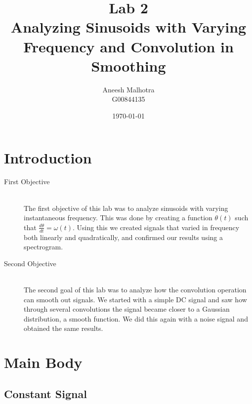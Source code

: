 \documentclass{article}
\title{Lab 2 \\ Analyzing Sinusoids with Varying Frequency and Convolution in Smoothing} %
\author{Aneesh Malhotra \\ G00844135} %
\date{\today} %
\begin{document}
\maketitle %




\section{Introduction}



\begin{description}
\item[First Objective] \hfill \\
The first objective of this lab was to analyze sinusoids with varying instantaneous frequency. This was done by creating a function $\theta(t)$ such that $\frac{d \theta}{dt} = \omega(t)$. Using this we created signals that varied in frequency both linearly and quadratically, and confirmed our results using a spectrogram.
\item[Second Objective] \hfill \\
The second goal of this lab was to analyze how the convolution operation can smooth out signals. We started with a simple DC signal and saw how through several convolutions the signal became closer to a Gaussian distribution, a smooth function. We did this again with a noise signal and obtained the same results.
\end{description}


\section{Main Body}

\subsection{Constant Signal}
\end{document}
